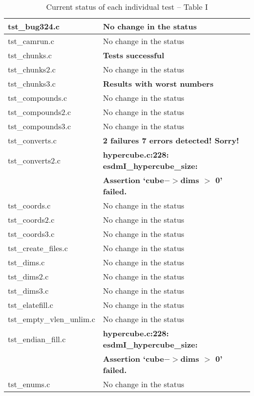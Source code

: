 \begin{table}[H]
\begin{tabular}{|l|l|}
tst\_bug324.c           &  No change in the status             \\ \hline
tst\_camrun.c           &  No change in the status             \\ \hline
tst\_chunks.c           &  \textbf{Tests successful}             \\ \hline
tst\_chunks2.c          &  No change in the status             \\ \hline
tst\_chunks3.c          &  \textbf{Results with worst numbers}             \\ \hline
tst\_compounds.c        &  No change in the status             \\ \hline
tst\_compounds2.c       &  No change in the status             \\ \hline
tst\_compounds3.c       &  No change in the status             \\ \hline
tst\_converts.c         &  \textbf{2 failures 7 errors detected! Sorry!}            \\ \hline
tst\_converts2.c        &  \textbf{hypercube.c:228: esdmI\_hypercube\_size:} \\
& \textbf{Assertion `cube$->$dims $>$ 0' failed. }            \\ \hline
tst\_coords.c           &  No change in the status             \\ \hline
tst\_coords2.c          &  No change in the status             \\ \hline
tst\_coords3.c          &  No change in the status             \\ \hline
tst\_create\_files.c    &  No change in the status             \\ \hline
tst\_dims.c             &  No change in the status             \\ \hline
tst\_dims2.c            &  No change in the status             \\ \hline
tst\_dims3.c            &  No change in the status             \\ \hline
tst\_elatefill.c        &  No change in the status             \\ \hline
tst\_empty\_vlen\_unlim.c   &  No change in the status         \\ \hline
tst\_endian\_fill.c     &   \textbf{hypercube.c:228: esdmI\_hypercube\_size:} \\
& \textbf{Assertion `cube$->$dims $>$ 0' failed.}            \\ \hline
tst\_enums.c            &  No change in the status             \\ \hline
\hline
\end{tabular}
\caption{\label{tab:nc_test4_status_11} Current status of each individual test -- Table I}
\end{table}


